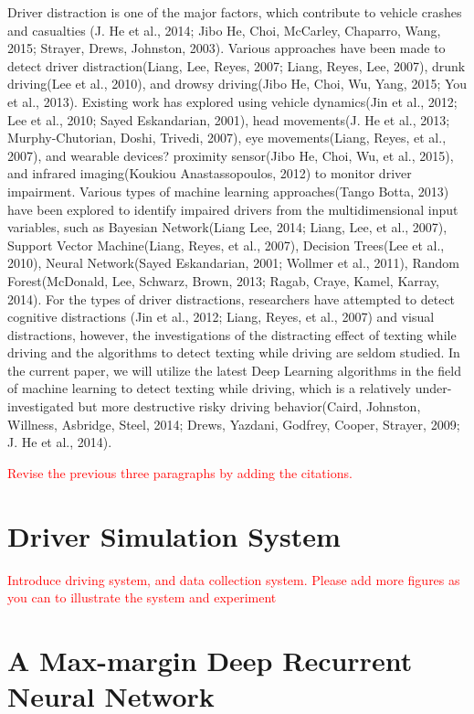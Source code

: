 \documentclass[journal]{IEEEtran}
\begin{document}
Driver distraction is one of the major factors, which contribute to vehicle crashes and casualties (J. He et al., 2014; Jibo He, Choi, McCarley, Chaparro,  Wang, 2015; Strayer, Drews, Johnston, 2003). Various approaches have been made to detect driver distraction(Liang, Lee,  Reyes, 2007; Liang, Reyes,  Lee, 2007), drunk driving(Lee et al., 2010), and drowsy driving(Jibo He, Choi, Wu,  Yang, 2015; You et al., 2013). Existing work has explored using vehicle dynamics(Jin et al., 2012; Lee et al., 2010; Sayed  Eskandarian, 2001), head movements(J. He et al., 2013; Murphy-Chutorian, Doshi,  Trivedi, 2007), eye movements(Liang, Reyes, et al., 2007), and wearable devices? proximity sensor(Jibo He, Choi, Wu, et al., 2015), and infrared imaging(Koukiou  Anastassopoulos, 2012) to monitor driver impairment. Various types of machine learning approaches(Tango  Botta, 2013) have been explored to identify impaired drivers from the multidimensional input variables, such as Bayesian Network(Liang  Lee, 2014; Liang, Lee, et al., 2007), Support Vector Machine(Liang, Reyes, et al., 2007), Decision Trees(Lee et al., 2010), Neural Network(Sayed  Eskandarian, 2001; Wollmer et al., 2011), Random Forest(McDonald, Lee, Schwarz, Brown, 2013; Ragab, Craye, Kamel,  Karray, 2014). For the types of driver distractions, researchers have attempted to detect cognitive distractions (Jin et al., 2012; Liang, Reyes, et al., 2007) and visual distractions, however, the investigations of the distracting effect of texting while driving and the algorithms to detect texting while driving are seldom studied. In the current paper, we will utilize the latest Deep Learning algorithms in the field of machine learning to detect texting while driving, which is a relatively under-investigated but more destructive risky driving behavior(Caird, Johnston, Willness, Asbridge,  Steel, 2014; Drews, Yazdani, Godfrey, Cooper, Strayer, 2009; J. He et al., 2014).

\textcolor{red}{Revise the previous three paragraphs by adding the citations.}

\section{Driver Simulation System}

\textcolor{red}{Introduce driving system, and data collection system. Please add more figures as you can to illustrate the system and experiment}
\section{A Max-margin Deep Recurrent Neural Network}
\end{document}
